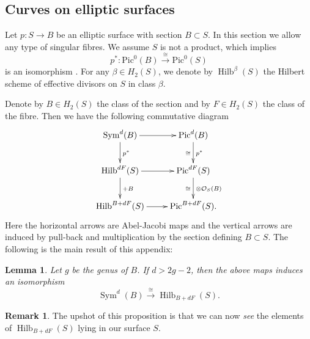 \documentclass{amsart}
\newtheorem{lemma}[theorem]{Lemma}
\theoremstyle{definition}
\newtheorem{remark}[theorem]{Remark}
\renewcommand{\O}{\mathcal{O}}
\newcommand{\Pic}{\mathrm{Pic}}
\newcommand{\Sym}{\operatorname{Sym}}
\newcommand{\Hilb}{\operatorname{Hilb}}
\begin{document}
\subsection{Curves on elliptic surfaces}\label{appHilb}

Let $p : S \rightarrow B$ be an elliptic surface with section $B \subset S$. In this section we allow any type of singular fibres. We assume $S$ is not a product, which implies
$$
p^* : \Pic^0(B) \stackrel{\cong}{\longrightarrow} \Pic^0(S)
$$
is an isomorphism \cite[VII.1.1]{Mir}. For any $\beta \in H_2(S)$, we denote by $\Hilb^\beta(S)$ the Hilbert scheme of effective divisors on $S$ in class $\beta$. 

Denote by $B \in H_2(S)$ the class of the section and by $F \in H_2(S)$ the class of the fibre. Then we have the following commutative diagram 
\begin{displaymath}
\xymatrix
{
\Sym^d(B) \ar[d]^{p^*} \ar[r] & \Pic^d(B) \ar[d]^{p^*}_{\cong} \\
\Hilb^{dF}(S) \ar[d]^{+B} \ar[r] & \Pic^{dF}(S) \ar[d]^{\otimes \O_S(B)}_{\cong} \\
\Hilb^{B+dF}(S) \ar[r] & \Pic^{B+dF}(S). 
}
\end{displaymath}
Here the horizontal arrows are Abel-Jacobi maps and the vertical arrows are induced by pull-back and multiplication by the section defining $B \subset S$. The following is the main result of this appendix:
\begin{lemma} \label{Hilbcvs}
Let $g$ be the genus of $B$. If $d > 2g - 2$, then the above maps induces an isomorphism
$$
\Sym^d(B) \stackrel{\cong}{\longrightarrow} \Hilb_{B+dF}(S).
$$
\end{lemma}

\begin{remark}
The upshot of this proposition is that we can now \emph{see} the elements of $\Hilb_{B+dF}(S)$ lying in our surface $S$.
\end{remark}
\end{document}
